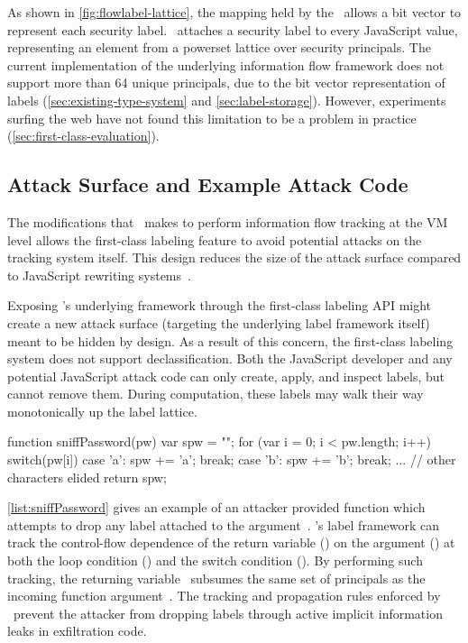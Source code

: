 As shown in \autoref{fig:flowlabel-lattice}, the mapping held by the \FlowLabelRegistry\ allows a bit vector to represent each security label.
\JitFlow\ attaches a security label to every JavaScript value, representing an element from a powerset lattice over security principals.
The current implementation of the underlying information flow framework does not support more than 64 unique principals, due to the bit vector representation of labels (\autoref{sec:existing-type-system} and \autoref{sec:label-storage}).
However, experiments surfing the web have not found this limitation to be a problem in practice (\autoref{sec:first-class-evaluation}).

\subsection{Attack Surface and Example Attack Code}
\label{subsec:attack}

The modifications that \JitFlow\ makes to perform information flow tracking at the VM level allows the first-class labeling feature to avoid potential attacks on the tracking system itself.
This design reduces the size of the attack surface compared to JavaScript rewriting systems~\cite{chugh.etal+09, jang.etal+10}.

Exposing \JitFlow's underlying framework through the first-class labeling API might create a new attack surface (targeting the underlying label framework itself) meant to be hidden by design.
As a result of this concern, the first-class labeling system does not support declassification.
Both the JavaScript developer and any potential JavaScript attack code can only create, apply, and inspect labels, but cannot remove them.
During computation, these labels may walk their way monotonically up the label lattice.

\begin{jscode}
function sniffPassword(pw) {
  var spw = "";
  for (var i = 0; i < pw.length; i++) {
    switch(pw[i]) {
    case 'a': spw += 'a'; break;
    case 'b': spw += 'b'; break;
    ... // other characters elided
    }
  }
  return spw;
}
\end{jscode}

\autoref{list:sniffPassword} gives an example of an attacker provided function which attempts to drop any label attached to the argument~.
\JitFlow's label framework can track the control-flow dependence of the return variable () on the argument () at both the loop condition () and the switch condition ().
By performing such tracking, the returning variable~ subsumes the same set of principals as the incoming function argument~.
The tracking and propagation rules enforced by \JitFlow\ prevent the attacker from dropping labels through active implicit information leaks in exfiltration code.

